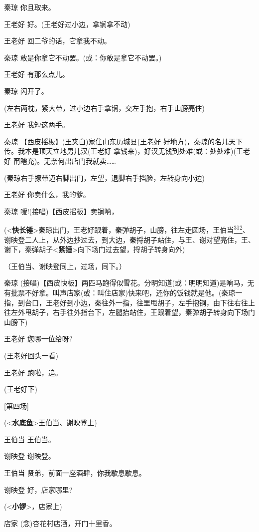 秦琼 你且取来。

王老好 好。(王老好过小边，拿锏拿不动)

王老好 回二爷的话，它拿我不动。

秦琼 敢是你拿它不动罢。(或：你敢是拿它不动罢。)

王老好 有那么点儿。

秦琼 闪开了。

(左右两枕，紧大带，过小边右手拿锏，交左手抱，右手山膀亮住)

王老好 我短这两手。

秦琼 【西皮摇板】(王夹白)家住山东历城县(王老好
好地方)，秦琼的名儿天下传。我本是顶天立地男儿汉(王老好
拿钱来)，好汉无钱到处难(或：处处难)(王老好
甭瞎充)。无奈何出店门我就卖\ldots{}\ldots{}

(秦琼右手撩带迈右脚出门，左望，退脚右手挡脸，左转身向小边)

王老好 你卖什么，我的爹。

秦琼 嗳!(接唱)【西皮摇板】卖锏呐，

(\textless{}\textbf{快长锤}\textgreater{}秦琼出门，王老好跟着，秦弹胡子，山膀，往左走圆场，王伯当\protect\hyperlink{fn312}{\textsuperscript{312}}、谢映登二人上，从外边抄过去，到大边，秦捋胡子站住，与王、谢对望亮住，王、谢下，秦弹胡子\textless{}\textbf{紧锤}\textgreater{}向下场门过去望，捋胡子转身向外)

（王伯当、谢映登同上，过场，同下。）

秦琼
(接唱)【西皮快板】两匹马跑得似雪花。分明知道(或：明明知道)是响马，无有批票不好拿。叫声店家(或：叫住店家)快来吧，还你的饭钱就是他。(秦琼一指，到台口，王老好到小边，秦往外一指，往里甩胡子，左手抱锏，由下往右往上往左外甩胡子，右手往外指台下，左腿抬站住，王跟着望，秦弹胡子转身向下场门山膀下)

王老好 您哪一位给呀?

(王老好回头一看)

王老好 跑啦，追。

(王老好下)

{[}第四场{]}

(\textless{}\textbf{水底鱼}\textgreater{}王伯当、谢映登上)

王伯当 王伯当。

谢映登 谢映登。

王伯当 贤弟，前面一座酒肆，你我歇息歇息。

谢映登 好，店家哪里?

(\textless{}\textbf{小锣}\textgreater{}，店家上)

店家 (念)杏花村店酒，开门十里香。

